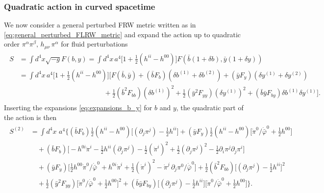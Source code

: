 \subsubsection{Quadratic action in curved spacetime}
\label{sec:qudratic_action_curved_spacetime}
%

We now consider a general perturbed FRW metric written as in \eqref{eq:general_perturbed_FLRW_metric} and expand the action up to quadratic order  $\pi^\alpha \pi^\beta,\,h_{\mu\nu}\,\pi^\alpha$ for fluid perturbations
{\small\begin{align}
\begin{aligned}
    S&=\int d^4x \sqrt{-g} F(b,y) = \int d^4x\,a^4 \big[1+\tfrac12 (h^{ii}-h^{00}) \big] F(\bar{b}(1+\delta b), \bar{y}(1+\delta y))
    \\
    &= \int \!\!\!d^4\!x\, a^4 \!\big[1+\tfrac12 (h^{ii}-h^{00}) \big]
    \Bigg[ F(\bar{b}, \bar{y}) + (\bar{b}F_b)  (\delta b^{(1)} + \delta b^{(2)}) + (\bar{y}F_y) (\delta y^{(1)} + \delta y^{(2)})\\
    &\,\,\qquad\qquad\qquad\qquad\qquad\qquad+ \tfrac12 (\bar{b}^2 F_{bb})(\delta b^{(1)})^2 + \tfrac12 (\bar{y}^2 F_{yy}) (\delta y^{(1)})^2
    + (\bar{b}\bar{y} F_{by}) \delta b^{(1)} \delta y^{(1)} \Bigg].
\end{aligned}
\end{align}}
Inserting the expansions \eqref{eq:expansions_b_y} for $b$ and $y$, the quadratic part of the action is then
{\small\begin{align}
\begin{aligned}
    S^{(2)}&=\int d^4x\,\, a^4 \bigg\{
        (\bar{b}F_b) \tfrac12(h^{ii}-h^{00}) \Big[(\partial_j \pi^j) - \tfrac12 h^{ii}\Big]
        + (\bar{y}F_y) \tfrac12 (h^{ii}-h^{00}) \Big[\dot{\pi}^0/\dot{\bar{\varphi}}^0+\tfrac12 h^{00}\Big]\\
    &\quad + (\bar{b}F_b) \Big[ - h^{0 i} \dot{\pi}^i - \tfrac12  h^{ii} (\partial_j \pi^j) - \tfrac12 (\dot{\pi}^i)^2 + \tfrac12 (\partial_j \pi^j)^2 -\tfrac12 \partial_i\pi^j\partial_j\pi^i\Big]
    \\
    &\quad + (\bar{y}F_y) \Big[ \tfrac12 h^{00}\dot{\pi}^0/\dot{\bar{\varphi}}^0+ h^{0 i} \dot{\pi}^i + \tfrac12 (\dot{\pi}^i)^2 -\dot{\pi}^j\,\partial_j\pi^0/\dot{\bar{\varphi}}^0\Big]
    + \tfrac12 (\bar{b}^2 F_{bb})\Big[ (\partial_j \pi^j) - \tfrac12 h^{ii}\Big]^2
    \\
    &\quad + \tfrac12 (\bar{y}^2 F_{yy})\Big[\dot{\pi}^0/\dot{\bar{\varphi}}^0+\tfrac12 h^{00}\Big]^2
    + (\bar{b}\bar{y} F_{by}) \Big[(\partial_j \pi^j) - \tfrac12 h^{ii}\Big]\Big[\dot{\pi}^0/\dot{\bar{\varphi}}^0+\tfrac12 h^{00}\Big]
        \bigg\}.
\end{aligned}
\end{align}}
